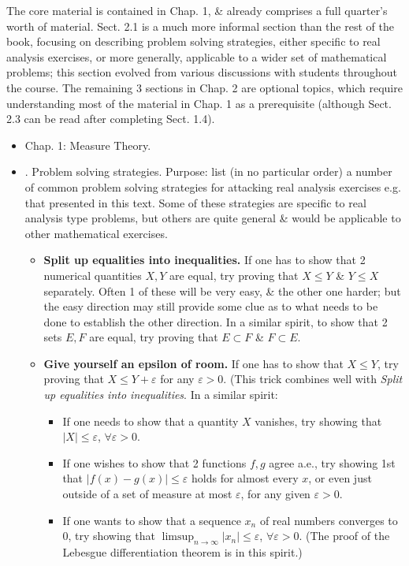 \documentclass{article}
\begin{document}
\begin{enumerate}
	The core material is contained in Chap. 1, \& already comprises a full quarter's worth of material. Sect. 2.1 is a much more informal section than the rest of the book, focusing on describing problem solving strategies, either specific to real analysis exercises, or more generally, applicable to a wider set of mathematical problems; this section evolved from various discussions with students throughout the course. The remaining 3 sections in Chap. 2 are optional topics, which require understanding most of the material in Chap. 1 as a prerequisite (although Sect. 2.3 can be read after completing Sect. 1.4).
	\begin{itemize}
		\item {\sf Chap. 1: Measure Theory.}
		\item {. Problem solving strategies.} Purpose: list (in no particular order) a number of common problem solving strategies for attacking real analysis exercises e.g. that presented in this text. Some of these strategies are specific to real analysis type problems, but others are quite general \& would be applicable to other mathematical exercises.
		\begin{itemize}
			\item {\bf Split up equalities into inequalities.} If one has to show that 2 numerical quantities $X,Y$ are equal, try proving that $X\le Y$ \& $Y\le X$ separately. Often 1 of these will be very easy, \& the other one harder; but the easy direction may still provide some clue as to what needs to be done to establish the other direction. In a similar spirit, to show that 2 sets $E,F$ are equal, try proving that $E\subset F$ \& $F\subset E$.
			\item {\bf Give yourself an epsilon of room.} If one has to show that $X\le Y$, try proving that $X\le Y + \varepsilon$ for any $\varepsilon > 0$. (This trick combines well
			with {\it Split up equalities into inequalities}. In a similar spirit:
			\begin{itemize}
				\item If one needs to show that a quantity $X$ vanishes, try showing that $|X|\le\varepsilon$, $\forall\varepsilon > 0$.
				\item If one wishes to show that 2 functions $f,g$ agree a.e., try showing 1st that $|f(x) - g(x)|\le\varepsilon$ holds for almost every $x$, or even just outside of a set of measure at most $\varepsilon$, for any given $\varepsilon > 0$.
				\item If one wants to show that a sequence $x_n$ of real numbers converges to 0, try showing that $\limsup_{n\to\infty} |x_n|\le\varepsilon$, $\forall\varepsilon > 0$. (The proof of the Lebesgue differentiation theorem is in this spirit.)

\end{itemize}
\end{itemize}
\end{itemize}
\end{enumerate}
\end{document}
